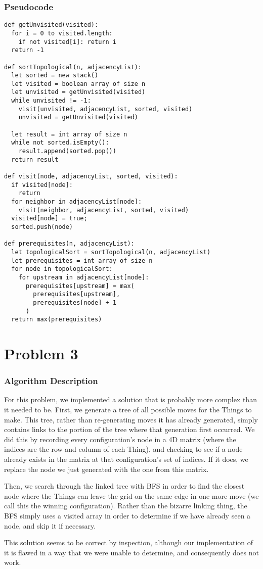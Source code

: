 \documentclass{math}
\begin{document}
\subsubsection*{Pseudocode}
\begin{lstlisting}
def getUnvisited(visited):
  for i = 0 to visited.length:
    if not visited[i]: return i
  return -1

def sortTopological(n, adjacencyList):
  let sorted = new stack()
  let visited = boolean array of size n
  let unvisited = getUnvisited(visited)
  while unvisited != -1:
    visit(unvisited, adjacencyList, sorted, visited)
    unvisited = getUnvisited(visited)

  let result = int array of size n
  while not sorted.isEmpty():
    result.append(sorted.pop())
  return result

def visit(node, adjacencyList, sorted, visited):
  if visited[node]:
    return
  for neighbor in adjacencyList[node]:
    visit(neighbor, adjacencyList, sorted, visited)
  visited[node] = true;
  sorted.push(node)

def prerequisites(n, adjacencyList):
  let topologicalSort = sortTopological(n, adjacencyList)
  let prerequisites = int array of size n
  for node in topologicalSort:
    for upstream in adjacencyList[node]:
      prerequisites[upstream] = max(
        prerequisites[upstream],
        prerequisites[node] + 1
      )
  return max(prerequisites)
\end{lstlisting}

\section*{Problem 3}

\subsubsection*{Algorithm Description}
For this problem, we implemented a solution that is probably more complex than
it needed to be. First, we generate a tree of all possible moves for the Things
to make. This tree, rather than re-generating moves it has already generated,
simply contains links to the portion of the tree where that generation first
occurred. We did this by recording every configuration's node in a 4D matrix
(where the indices are the row and column of each Thing), and checking to see if
a node already exists in the matrix at that configuration's set of indices. If
it does, we replace the node we just generated with the one from this matrix.
\par
Then, we search through the linked tree with BFS in order to find the closest
node where the Things can leave the grid on the same edge in one more move (we
call this the winning configuration).  Rather than the bizarre linking thing,
the BFS simply uses a visited array in order to determine if we have already
seen a node, and skip it if necessary.
\par
This solution seems to be correct by inspection, although our implementation of
it is flawed in a way that we were unable to determine, and consequently does
not work.
\end{document}
